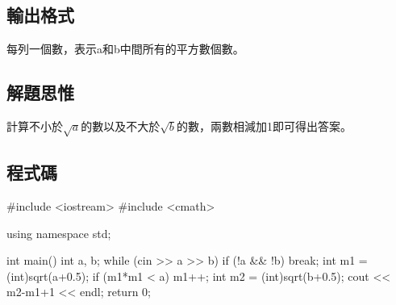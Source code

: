 \subsection{輸出格式}
每列一個數，表示a和b中間所有的平方數個數。

\subsection{解題思惟}
計算不小於$\sqrt{a}$的數以及不大於$\sqrt{b}$的數，兩數相減加1即可得出答案。

\subsection{程式碼}
\begin{cppcode}
#include <iostream>
#include <cmath>

using namespace std;

int main()
{
	int a, b;
	while (cin >> a >> b) {
		if (!a && !b) break;
		int m1 = (int)sqrt(a+0.5);
		if (m1*m1 < a) m1++;
		int m2 = (int)sqrt(b+0.5);
		cout << m2-m1+1 << endl;
	}
	return 0;
}
\end{cppcode}
